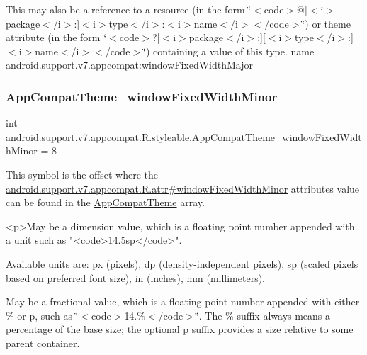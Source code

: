 This may also be a reference to a resource (in the form \char`\"{}$<$code$>$@\mbox{[}$<$i$>$package$<$/i$>$\+:\mbox{]}$<$i$>$type$<$/i$>$\+:$<$i$>$name$<$/i$>$$<$/code$>$\char`\"{}) or theme attribute (in the form \char`\"{}$<$code$>$?\mbox{[}$<$i$>$package$<$/i$>$\+:\mbox{]}\mbox{[}$<$i$>$type$<$/i$>$\+:\mbox{]}$<$i$>$name$<$/i$>$$<$/code$>$\char`\"{}) containing a value of this type.  name android.\+support.\+v7.\+appcompat\+:window\+Fixed\+Width\+Major \mbox{\label{classandroid_1_1support_1_1v7_1_1appcompat_1_1R_1_1styleable_a373701a9ce98e38b9d2527222d764011}} 
\subsubsection{\texorpdfstring{App\+Compat\+Theme\+\_\+window\+Fixed\+Width\+Minor}{AppCompatTheme\_windowFixedWidthMinor}}
{\footnotesize\ttfamily int android.\+support.\+v7.\+appcompat.\+R.\+styleable.\+App\+Compat\+Theme\+\_\+window\+Fixed\+Width\+Minor = 8\hspace{0.3cm}{\ttfamily [static]}}

This symbol is the offset where the \hyperlink{classandroid_1_1support_1_1v7_1_1appcompat_1_1R_1_1attr_a4959f1dee20f8e0c30bc87c8400018d8}{android.\+support.\+v7.\+appcompat.\+R.\+attr\#window\+Fixed\+Width\+Minor} attribute\textquotesingle{}s value can be found in the \hyperlink{classandroid_1_1support_1_1v7_1_1appcompat_1_1R_1_1styleable_a5c42f89e8a410c323be34208d75c430b}{App\+Compat\+Theme} array.

\begin{DoxyVerb}      <p>May be a dimension value, which is a floating point number appended with a unit such as "<code>14.5sp</code>".
\end{DoxyVerb}
 Available units are\+: px (pixels), dp (density-\/independent pixels), sp (scaled pixels based on preferred font size), in (inches), mm (millimeters). 

May be a fractional value, which is a floating point number appended with either \% or p, such as \char`\"{}$<$code$>$14.\%$<$/code$>$\char`\"{}. The \% suffix always means a percentage of the base size; the optional p suffix provides a size relative to some parent container. 

